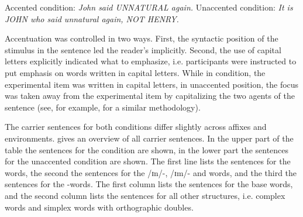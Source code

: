 \begin{exe} 
	\ex \label{example accented condition} Accented condition:  \hspace*{.5cm}\textit{John said UNNATURAL again.}
	\ex \label{example unaccented condition} Unaccented condition: \hspace*{0cm} \textit{It is JOHN who said unnatural again, NOT HENRY.}
\end{exe}

Accentuation was controlled in two ways. First, the syntactic position of the stimulus in the sentence led the reader's  implicitly. Second, the use of capital letters explicitly indicated what to emphasize,  i.e. participants were instructed to put emphasis on words written in capital letters. While in  condition, the experimental item was written in capital letters, in unaccented position, the focus was taken away from the experimental item by capitalizing  the two agents of the sentence (see, for example, \cite{Plag.2011} for a similar methodology).


The carrier sentences for both conditions differ slightly across affixes and environments.  gives an overview of all carrier sentences. In the upper part of the table the sentences for the  condition are shown, in the lower part the sentences for the unaccented condition are shown. 
The first line lists the sentences for the words, the second the sentences for the /ɪn/-, /ɪm/- and words, and the third the sentences for the -words.
The first column lists the sentences for the base words, and the second column lists the sentences for all other structures, i.e. complex words and simplex words with orthographic doubles. 




